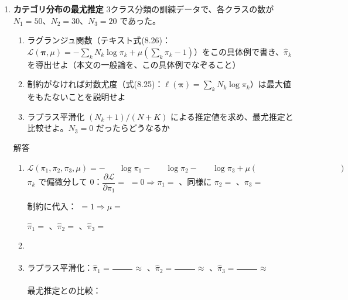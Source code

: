\documentclass[a4paper,dvipdfmx]{jsarticle}
\newcommand{\提出期限}{2026年11月16日（月）}
\newcommand{\学籍番号}{0000000}
\newcommand{\氏名}{氏名を書く}
\newcommand{\提出日}{2026年11月16日}
\newenvironment{answer}{\begin{itembox}[l]{解答}}{\end{itembox}}
\begin{document}
\begin{enumerate}
  \item \textbf{カテゴリ分布の最尤推定}\quad
    3クラス分類の訓練データで、各クラスの数が $N_1 = 50$、$N_2 = 30$、$N_3 = 20$ であった。
    \begin{enumerate}
      \item ラグランジュ関数（テキスト式(8.26)：$\mathcal{L}(\bm{\pi}, \mu) = -\sum_k N_k \log\pi_k + \mu(\sum_k \pi_k - 1)$）をこの具体例で書き、$\hat{\pi}_k$ を導出せよ（本文の一般論を、この具体例でなぞること）
      \item 制約がなければ対数尤度（式(8.25)：$\ell(\bm{\pi}) = \sum_k N_k \log\pi_k$）は最大値をもたないことを説明せよ
      \item ラプラス平滑化 $(N_k + 1)/(N + K)$ による推定値を求め、最尤推定と比較せよ。$N_3 = 0$ だったらどうなるか
    \end{enumerate}
    \begin{answer}
      \begin{enumerate}
        \item
          \begin{equation*}
            \mathcal{L}(\pi_1, \pi_2, \pi_3, \mu) = -\phantom{XX}\log\pi_1 - \phantom{XX}\log\pi_2 - \phantom{XX}\log\pi_3 + \mu(\phantom{XXXXXXXXXXXX})
          \end{equation*}
          $\pi_k$ で偏微分して $0$：$\dfrac{\partial\mathcal{L}}{\partial\pi_1} = $ \phantom{XXXXXXXX} $= 0 \Rightarrow \pi_1 = $ \phantom{XXXX}、同様に $\pi_2 = $ \phantom{XXXX}、$\pi_3 = $ \phantom{XXXX}
          \vspace{2mm}

          制約に代入：\phantom{XXXXXXXXXXXXXXXX} $= 1 \Rightarrow \mu = $ \phantom{XXX}
          \vspace{2mm}

          $\hat{\pi}_1 = $ \phantom{XXXX}、$\hat{\pi}_2 = $ \phantom{XXXX}、$\hat{\pi}_3 = $ \phantom{XXXX}
          \vspace{4mm}
        \item
          \vspace{12mm}
        \item ラプラス平滑化：$\hat{\pi}_1 = \dfrac{\phantom{XX}}{\phantom{XXX}} \approx$ \phantom{XXXX}、$\hat{\pi}_2 = \dfrac{\phantom{XX}}{\phantom{XXX}} \approx$ \phantom{XXXX}、$\hat{\pi}_3 = \dfrac{\phantom{XX}}{\phantom{XXX}} \approx$ \phantom{XXXX}
          \vspace{2mm}

          最尤推定との比較：
          \vspace{8mm}


\end{enumerate}
\end{answer}
\end{enumerate}
\end{document}
